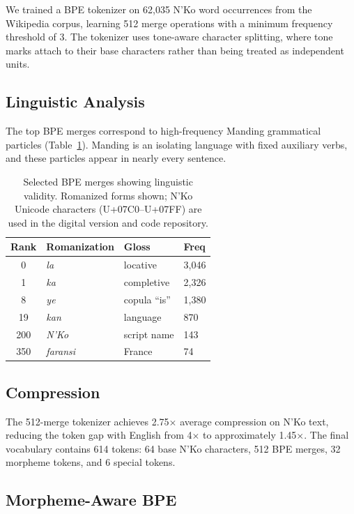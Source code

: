 \documentclass[11pt]{article}
\begin{document}
We trained a BPE tokenizer on 62,035 N'Ko word occurrences from the Wikipedia corpus, learning 512 merge operations with a minimum frequency threshold of 3.
The tokenizer uses tone-aware character splitting, where tone marks attach to their base characters rather than being treated as independent units.

\subsection{Linguistic Analysis}

The top BPE merges correspond to high-frequency Manding grammatical particles (Table~\ref{tab:bpe-merges}).
Manding is an isolating language with fixed auxiliary verbs, and these particles appear in nearly every sentence.

\begin{table}[t]
\centering
\small
\begin{tabular}{clll}
\toprule
\textbf{Rank} & \textbf{Romanization} & \textbf{Gloss} & \textbf{Freq} \\
\midrule
0 & \textit{la} & locative & 3,046 \\
1 & \textit{ka} & completive & 2,326 \\
8 & \textit{ye} & copula ``is'' & 1,380 \\
19 & \textit{kan} & language & 870 \\
200 & \textit{N'Ko} & script name & 143 \\
350 & \textit{faransi} & France & 74 \\
\bottomrule
\end{tabular}
\caption{Selected BPE merges showing linguistic validity. Romanized forms shown; N'Ko Unicode characters (U+07C0--U+07FF) are used in the digital version and code repository.}
\label{tab:bpe-merges}
\end{table}

\subsection{Compression}

The 512-merge tokenizer achieves 2.75$\times$ average compression on N'Ko text, reducing the token gap with English from 4$\times$ to approximately 1.45$\times$.
The final vocabulary contains 614 tokens: 64 base N'Ko characters, 512 BPE merges, 32 morpheme tokens, and 6 special tokens.

\subsection{Morpheme-Aware BPE}
\end{document}
